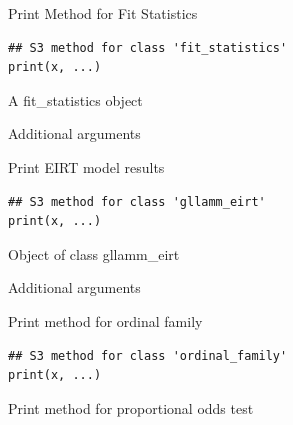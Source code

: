 \documentclass[a4paper]{book}
\begin{document}
%
\begin{Description}
Print Method for Fit Statistics
\end{Description}
%
\begin{Usage}
\begin{verbatim}
## S3 method for class 'fit_statistics'
print(x, ...)
\end{verbatim}
\end{Usage}
%
\begin{Arguments}
\begin{ldescription}
\item[\code{x}] A fit\_statistics object

\item[\code{...}] Additional arguments
\end{ldescription}
\end{Arguments}
%
\begin{Description}
Print EIRT model results
\end{Description}
%
\begin{Usage}
\begin{verbatim}
## S3 method for class 'gllamm_eirt'
print(x, ...)
\end{verbatim}
\end{Usage}
%
\begin{Arguments}
\begin{ldescription}
\item[\code{x}] Object of class gllamm\_eirt

\item[\code{...}] Additional arguments
\end{ldescription}
\end{Arguments}
%
\begin{Description}
Print method for ordinal family
\end{Description}
%
\begin{Usage}
\begin{verbatim}
## S3 method for class 'ordinal_family'
print(x, ...)
\end{verbatim}
\end{Usage}
%
\begin{Description}
Print method for proportional odds test
\end{Description}
\end{document}
